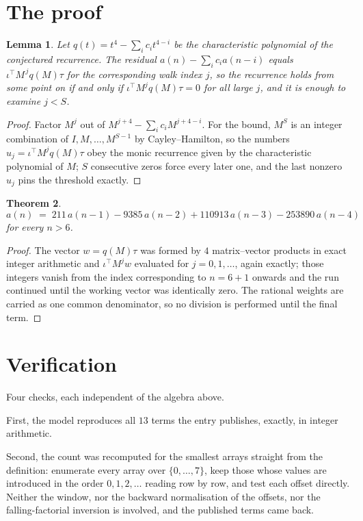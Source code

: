 \documentclass[11pt,a4paper]{article}
\theoremstyle{plain}
\newtheorem{theorem}{Theorem}
\newtheorem{lemma}[theorem]{Lemma}
\theoremstyle{definition}
\begin{document}
\section{The proof}

\begin{lemma}\label{lem:crit}
Let $q(t)=t^{4}-\sum_i c_it^{4-i}$ be the characteristic polynomial of the
conjectured recurrence. The residual $a(n)-\sum_ic_ia(n-i)$ equals
$\iota^{\!\top}M^{\,j}q(M)\tau$ for the corresponding walk index $j$, so the recurrence
holds from some point on if and only if $\iota^{\!\top}M^{j}q(M)\tau=0$ for all large $j$,
and it is enough to examine $j<S$.
\end{lemma}

\begin{proof}
Factor $M^{j}$ out of $M^{j+4}-\sum_ic_iM^{j+4-i}$. For the bound, $M^{S}$
is an integer combination of $I,M,\dots,M^{S-1}$ by Cayley--Hamilton, so the numbers
$u_j=\iota^{\!\top}M^{j}q(M)\tau$ obey the monic recurrence given by the characteristic
polynomial of $M$; $S$ consecutive zeros force every later one, and the last nonzero $u_j$
pins the threshold exactly.
\end{proof}

\begin{theorem}
\[
a(n)\;=\;211\,a(n-1) - 9385\,a(n-2) + 110913\,a(n-3) - 253890\,a(n-4)
\]
for every $n>6$.
\end{theorem}

\begin{proof}
The vector $w=q(M)\tau$ was formed by $4$ matrix--vector products in exact integer
arithmetic and $\iota^{\!\top}M^{j}w$ evaluated for $j=0,1,\dots$, again exactly; those
integers vanish from the index corresponding to $n=6+1$ onwards and the run continued
until the working vector was identically zero. The rational weights are carried as one common
denominator, so no division is performed until the final term.
\end{proof}

\section{Verification}

Four checks, each independent of the algebra above.

First, the model reproduces all $13$ terms the entry publishes, exactly, in integer
arithmetic.

Second, the count was recomputed for the smallest arrays straight from the definition:
enumerate every array over $\{0,\dots,7\}$, keep those whose values are introduced in the
order $0,1,2,\dots$ reading row by row, and test each offset directly. Neither the window, nor
the backward normalisation of the offsets, nor the falling-factorial inversion is involved, and
the published terms came back.
\end{document}
